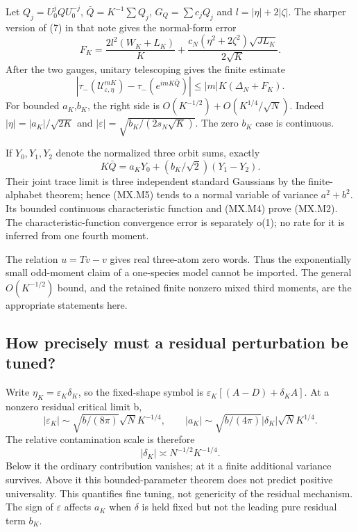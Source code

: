 Let \(Q_j=U_0^jQU_0^{-j}\), \(\bar Q=K^{-1}\sum Q_j\), \(G_Q=\sum c_jQ_j\) and \(l=|\eta|+2|\zeta|\). The sharper version of (7) in that note gives the normal-form error \[
 F_K=\frac{2l^2(W_K+L_K)}K+
       \frac{c_N(\eta^2+2\zeta^2)\sqrt{JL_K}}{2\sqrt K}.
\] After the two gauges, unitary telescoping gives the finite estimate \[
 \left|\tau_-(\mathcal U_{\varepsilon,\eta}^{mK})
                  -\tau_-(e^{imK\bar Q})\right|
                         \leq|m|K(\Delta_N+F_K).              \tag{MX.M4}
\] For bounded \(a_{K}\),\(b_{K}\), the right side is \(O(K^{-1/2})+O(K^{1/4}/\sqrt N)\). Indeed \(|\eta|=|a_K|/\sqrt{2K}\) and \(|\varepsilon|=\sqrt{b_K/(2s_N\sqrt K)}\). The zero \(b_{K}\) case is continuous.

If \(Y_0,Y_1,Y_2\) denote the normalized three orbit sums, exactly \[
 K\bar Q=a_KY_0+(b_K/\sqrt2)(Y_1-Y_2).                       \tag{MX.M5}
\] Their joint trace limit is three independent standard Gaussians by the finite-alphabet theorem; hence (MX.M5) tends to a normal variable of variance \(a^2+b^2\). Its bounded continuous characteristic function and (MX.M4) prove (MX.M2). The characteristic-function convergence error is separately o(1); no rate for it is inferred from one fourth moment.

The relation \(u=Tv-v\) gives real three-atom zero words. Thus the exponentially small odd-moment claim of a one-species model cannot be imported. The general \(O(K^{-1/2})\) bound, and the retained finite nonzero mixed third moments, are the appropriate statements here.

\subsection{How precisely must a residual perturbation be tuned?}\label{mixed:how-precisely-must-a-residual-perturbation-be-tuned}

Write \(\eta_K=\varepsilon_K\delta_K\), so the fixed-shape symbol is \(\varepsilon_K[(A-D)+\delta_KA]\). At a nonzero residual critical limit b, \[
 |\varepsilon_K|\sim\sqrt{b/(8\pi)}\sqrt N K^{-1/4},\qquad
 |a_K|\sim\sqrt{b/(4\pi)}|\delta_K|\sqrt N K^{1/4}.
\] The relative contamination scale is therefore \[
 \boxed{|\delta_K|\asymp N^{-1/2}K^{-1/4}.}                  \tag{MX.M6}
\] Below it the ordinary contribution vanishes; at it a finite additional variance survives. Above it this bounded-parameter theorem does not predict positive universality. This quantifies fine tuning, not genericity of the residual mechanism. The sign of \(\varepsilon\) affects \(a_{K}\) when \(\delta\) is held fixed but not the leading pure residual term \(b_{K}\).


